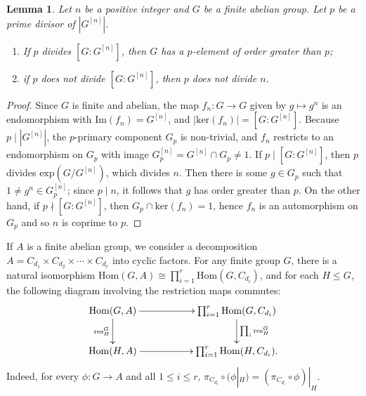 \documentclass[letterpaper,12pt]{article}
\theoremstyle{plain}
\newtheorem{lemma}[theorem]{Lemma}
\theoremstyle{definition}
\begin{document}
\begin{lemma}
    Let $n$ be a positive integer and $G$ be a finite abelian group. Let $p$ be a prime divisor of $\left|G^{[n]}\right|$.
    \begin{enumerate}
        \item If $p$ divides $\left[G:G^{[n]}\right]$, then $G$ has a $p$-element of order greater than $p$;
        \item if $p$ does not divide $\left[G:G^{[n]}\right]$, then $p$ does not divide $n$.
    \end{enumerate}
\end{lemma}
\begin{proof}
    Since $G$ is finite and abelian, the map $f_n:G\to G$ given by $g\mapsto g^n$ is an endomorphism with $\mathrm{Im}(f_n)=G^{[n]}$, and $\left|\mathrm{ker}(f_n)\right|=\left[G:G^{[n]}\right]$. Because $p\mid \left|G^{[n]}\right|$, the $p$-primary component $G_p$ is non-trivial, and $f_n$ restricts to an endomorphism on $G_p$ with image $G^{[n]}_p=G^{[n]}\cap G_p\neq 1$. If $p\mid \left[G:G^{[n]}\right]$, then $p$ divides $\mathrm{exp}\left(G/G^{[n]}\right)$, which divides $n$. Then there is some $g\in G_p$ such that $1\neq g^n\in G^{[n]}_p$; since $p\mid n$, it follows that $g$ has order greater than $p$. On the other hand, if $p\nmid \left[G:G^{[n]}\right]$, then $G_p\cap \mathrm{ker}(f_n)=1$, hence $f_n$ is an automorphism on $G_p$ and so $n$ is coprime to $p$.
\end{proof}

If $A$ is a finite abelian group, we consider a decomposition $A=C_{d_1}\times C_{d_2}\times \cdots \times C_{d_r}$ into cyclic factors. For any finite group $G$, there is a natural isomorphism $\text{Hom}(G,A)\cong \prod_{i=1}^r\text{Hom}(G,C_{d_i})$, and for each $H\leq G$, the following diagram involving the restriction maps commutes:
    $$\xymatrix{
        \mathrm{Hom}(G,A)\ar[d]_{\mathrm{res}^G_H}\ar[rr] &&\prod_{i=1}^r\mathrm{Hom}(G,C_{d_i})\ar[d]^{\prod_i\text{res}^G_H}\\
        \mathrm{Hom}(H,A)\ar[rr] &&\prod_{i=1}^r\mathrm{Hom}(H,C_{d_i}).
    }$$
Indeed, for every $\phi:G\longrightarrow A$ and all $1\leq i \leq r$, $\pi_{C_{d_i}}\circ (\phi|_H)=(\pi_{C_{d_i}}\circ \phi)|_H$.
\end{document}

